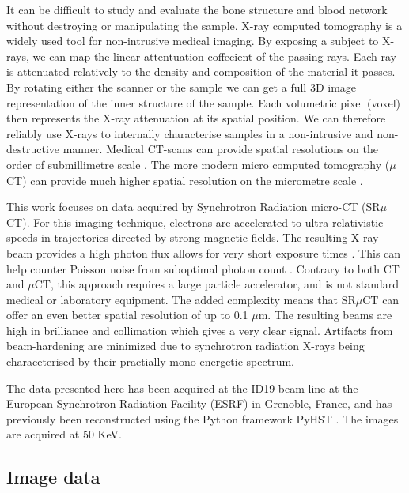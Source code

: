 It can be difficult to study and evaluate the bone structure and blood network without destroying
or manipulating the sample. X-ray computed tomography is a widely used tool for non-intrusive medical
imaging. By exposing a subject to X-rays, we can map the linear attentuation coffecient of the passing
rays. Each ray is attenuated relatively to the density and composition of the material it passes.
By rotating either the scanner or the sample we can get a full 3D image representation of the inner
structure of the sample. Each volumetric pixel (voxel) then represents the X-ray attenuation at its
spatial position. We can therefore reliably use X-rays to internally characterise samples in a
non-intrusive and non-destructive manner. Medical CT-scans can provide spatial resolutions on the
order of submillimetre scale \citep{medicalct}. The more modern micro computed tomography ($\mu$CT)
can provide much higher spatial resolution on the micrometre scale \citep{srexptime}.

This work focuses on data acquired by Synchrotron Radiation micro-CT (SR$\mu$CT). For this imaging
technique, electrons are accelerated to ultra-relativistic speeds in trajectories directed by strong
magnetic fields. The resulting X-ray beam provides a high photon flux allows for very short exposure
times \citep{srexptime}. This can help counter Poisson noise from suboptimal photon count \citep{srnoise}.
Contrary to both CT and $\mu$CT, this approach requires a large particle accelerator,
and is not standard medical or laboratory equipment. The added complexity means that SR$\mu$CT can
offer an even better spatial resolution of up to 0.1 $\mu$m. The resulting beams are high in
brilliance and collimation which gives a very clear signal. Artifacts from beam-hardening are
minimized due to synchrotron radiation X-rays being characeterised by their practially mono-energetic
spectrum.

The data presented here has been acquired at the ID19 beam line at the European Synchrotron
Radiation Facility (ESRF) in Grenoble, France, and has previously \citep{sporring} been
reconstructed using the Python framework PyHST \citep{pyhst}. The images are acquired at 50 KeV.

\subsection{Image data}

